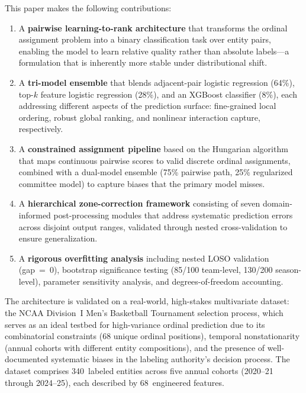 \documentclass[conference]{IEEEtran}
\begin{document}
This paper makes the following contributions:

\begin{enumerate}
\item A \textbf{pairwise learning-to-rank architecture} that transforms the ordinal assignment problem into a binary classification task over entity pairs, enabling the model to learn relative quality rather than absolute labels---a formulation that is inherently more stable under distributional shift.

\item A \textbf{tri-model ensemble} that blends adjacent-pair logistic regression (64\%), top-$k$ feature logistic regression (28\%), and an XGBoost classifier (8\%), each addressing different aspects of the prediction surface: fine-grained local ordering, robust global ranking, and nonlinear interaction capture, respectively.

\item A \textbf{constrained assignment pipeline} based on the Hungarian algorithm~\cite{kuhn1955hungarian} that maps continuous pairwise scores to valid discrete ordinal assignments, combined with a dual-model ensemble (75\% pairwise path, 25\% regularized committee model) to capture biases that the primary model misses.

\item A \textbf{hierarchical zone-correction framework} consisting of seven domain-informed post-processing modules that address systematic prediction errors across disjoint output ranges, validated through nested cross-validation to ensure generalization.

\item A \textbf{rigorous overfitting analysis} including nested LOSO validation (gap~=~0), bootstrap significance testing (85/100 team-level, 130/200 season-level), parameter sensitivity analysis, and degrees-of-freedom accounting.
\end{enumerate}

The architecture is validated on a real-world, high-stakes multivariate dataset: the NCAA Division~I Men's Basketball Tournament selection process, which serves as an ideal testbed for high-variance ordinal prediction due to its combinatorial constraints (68 unique ordinal positions), temporal nonstationarity (annual cohorts with different entity compositions), and the presence of well-documented systematic biases in the labeling authority's decision process. The dataset comprises 340~labeled entities across five annual cohorts (2020--21 through 2024--25), each described by 68~engineered features.
\end{document}
